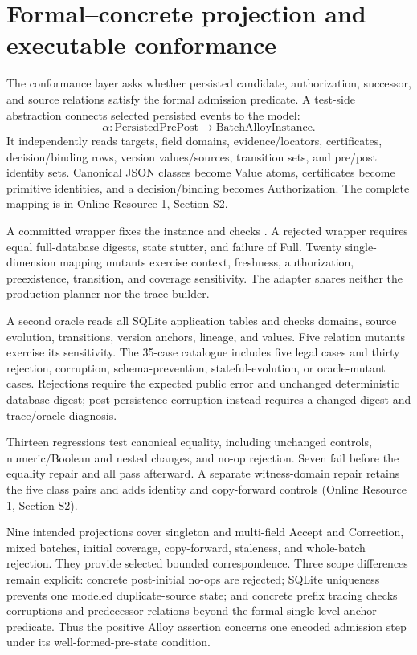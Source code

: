 \section{Formal--concrete projection and executable conformance}
\label{sec:conformance}

The conformance layer asks whether persisted candidate, authorization, successor, and source relations satisfy the formal admission predicate. A test-side abstraction connects selected persisted events to the model:
\begin{equation}
\alpha:\mathrm{PersistedPrePost}\rightarrow\mathrm{BatchAlloyInstance}.
\end{equation}
It independently reads targets, field domains, evidence/locators, certificates, decision/binding rows, version values/sources, transition sets, and pre/post identity sets. Canonical JSON classes become Value atoms, certificates become primitive identities, and a decision/binding becomes Authorization. The complete mapping is in Online Resource 1, Section S2.

A committed wrapper fixes the instance and checks . A rejected wrapper requires equal full-database digests, state stutter, and failure of Full. Twenty single-dimension mapping mutants exercise context, freshness, authorization, preexistence, transition, and coverage sensitivity. The adapter shares neither the production planner nor the trace builder.

A second oracle reads all SQLite application tables and checks domains, source evolution, transitions, version anchors, lineage, and values. Five relation mutants exercise its sensitivity. The 35-case catalogue includes five legal cases and thirty rejection, corruption, schema-prevention, stateful-evolution, or oracle-mutant cases. Rejections require the expected public error and unchanged deterministic database digest; post-persistence corruption instead requires a changed digest and trace/oracle diagnosis.

Thirteen regressions test canonical equality, including unchanged controls, numeric/Boolean and nested changes, and no-op rejection. Seven fail before the equality repair and all pass afterward. A separate witness-domain repair retains the five class pairs and adds identity and copy-forward controls (Online Resource 1, Section S2).

Nine intended projections cover singleton and multi-field Accept and Correction, mixed batches, initial coverage, copy-forward, staleness, and whole-batch rejection. They provide selected bounded correspondence. Three scope differences remain explicit: concrete post-initial no-ops are rejected; SQLite uniqueness prevents one modeled duplicate-source state; and concrete prefix tracing checks corruptions and predecessor relations beyond the formal single-level anchor predicate. Thus the positive Alloy assertion concerns one encoded admission step under its well-formed-pre-state condition.
